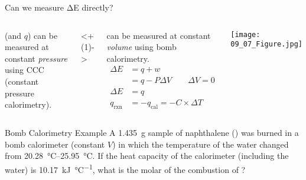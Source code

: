 \documentclass[notes=only]{beamer}
\begin{document}
\begin{frame}{Can we measure ΔE directly?}
	\begin{columns}
		\enthalpy*[superscript=]{} (and $q$) can be
		measured at constant \emph{pressure} using
		CCC (constant pressure
		calorimetry).

		\onslide<+(1)->
		\vspace{\baselineskip}

		\energy*[superscript=]{} can be measured at
		constant \emph{volume} using \alert{bomb
		calorimetry}.
		\begin{align*}
			\Delta E &= q + w \\
			&= q - P\Delta V \qquad \Delta V = 0 \\
			\Delta E &= q \\
			q_\text{rxn} &= -q_\text{cal} = -C
			\times \Delta T
		\end{align*}
		
		\begin{center}
			\texttt{[image: 09\_07\_Figure.jpg]}
		\end{center}
	\end{columns}
\end{frame}


\begin{frame}[t]{Bomb Calorimetry Example}
	A \SI{1.435}{\gram} sample of naphthalene () was burned in a
	bomb calorimeter (constant $V$) in which the temperature of the water
	changed from \SIrange{20.28}{25.95}{\celsius}. If the heat capacity of
	the calorimeter (including the water) is
	\SI{10.17}{\kilo\joule\per\celsius}, what is the molar
	\energy*[superscript=]{} of the
	combustion of ?

\end{frame}
\end{document}
